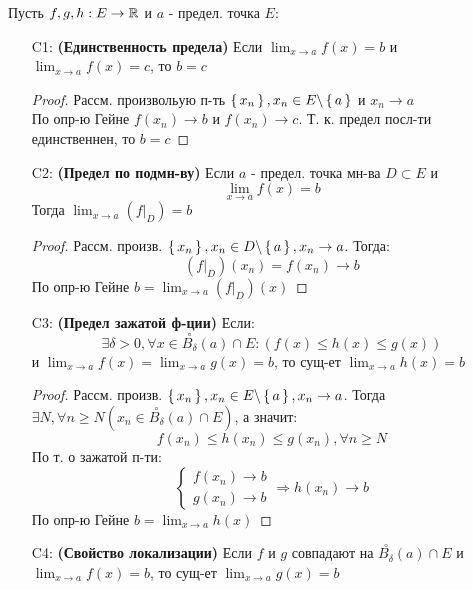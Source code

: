 Пусть $f, g, h: E \rightarrow \mathbb{R}$ и $a$ - предел. точка $E$:
\begin{itemize}
  \item [C1: ] \textbf{(Единственность предела)} Если $\lim_{x\to a} f(x) = b$ и $\lim_{x\to a} f(x) = c$, то $b = c$
    \begin{proof}
    Рассм. произвольую п-ть $\set{x_n}, x_n \in E \backslash \set{a}$ и $x_n \rightarrow a$ \\ 

    По опр-ю Гейне $f(x_n) \rightarrow b$ и $f(x_n) \rightarrow c$. Т. к. предел посл-ти единственнен, то $b = c$
    \end{proof} 
  \item [C2: ] \textbf{(Предел по подмн-ву)} Если $a$ - предел. точка мн-ва $D \subset E$ и
    \[
      \lim_{x\to a} f(x) = b
    \]
    Тогда $\lim_{x\to a} (f|_{D}) = b$
    \begin{proof}
    Рассм. произв. $\set{x_n}, x_n \in D \backslash \set{a}, x_n \rightarrow a$. Тогда:
    \[
      (f|_{D})(x_n) = f(x_n) \rightarrow b
    \]
    По опр-ю Гейне $ b = \lim_{x\to a}(f|_D)(x)$
    \end{proof}
  \item [C3: ] \textbf{(Предел зажатой ф-ции)} Если:
    \[
      \exists \delta > 0, \forall x \in \overset{\circ}{B_{\delta}}(a) \cap E \colon (f(x) \leq h(x) \leq g(x))
    \]
    и $\lim_{x\to a}f(x) = \lim_{x\to a} g(x) = b$, то сущ-ет $\lim_{x\to a} h(x) = b$

    \begin{proof}
    Рассм. произв. $\set{x_n}, x_n \in E \backslash \set{a}, x_n \rightarrow a$. Тогда $\exists N, \forall n \geq N (x_n \in \overset{\circ}{B_{\delta}}(a) \cap E)$, а значит:
    \[
    f(x_n) \leq h(x_n) \leq g(x_n), \forall n \geq N
    \]
    По т. о зажатой п-ти: 
    \[
    \begin{cases}
    f(x_n) \rightarrow b \\
    g(x_n) \rightarrow b
    \end{cases} \Rightarrow h(x_n) \rightarrow b
    \]
    По опр-ю Гейне $b = \lim_{x\to a}h(x)$
    \end{proof}
  \item [C4: ] \textbf{(Свойство локализации)} Если $f$ и $g$ совпадают на $\overset{\circ}{B_{\delta}}(a) \cap E$ и $\lim_{x\to a} f(x) = b$, то сущ-ет $\lim_{x \to a}g(x) = b$
\end{itemize}
